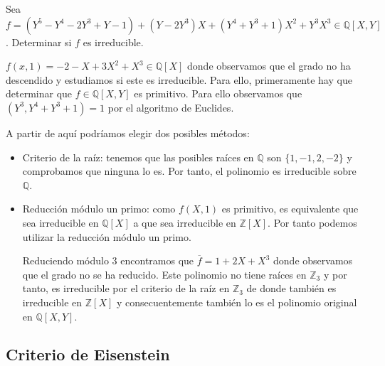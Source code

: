\begin{example}
Sea $f = (Y^5 - Y^4 - 2Y^3 + Y - 1) + (Y - 2Y^3)X + (Y^4 + Y^3 + 1)X^2 + Y^3X^3 \in \mathbb{Q}[X,Y]$. Determinar si $f$ es irreducible. 

$f(x,1) = -2-X+3X^2+X^3 \in \mathbb{Q}[X]$ donde observamos que el grado no ha descendido y estudiamos si este es irreducible. Para ello, primeramente hay que determinar que $f \in \mathbb{Q}[X,Y]$ es primitivo. Para ello observamos que $(Y^3,Y^4+Y^3+1) = 1$ por el algoritmo de Euclides. 

A partir de aquí podríamos elegir dos posibles métodos:

\begin{itemize}
\item Criterio de la raíz: tenemos que las posibles raíces en $\mathbb{Q}$ son $\{1,-1,2,-2\}$ y comprobamos que ninguna lo es. Por tanto, el polinomio es irreducible sobre $\mathbb{Q}$. 

\item Reducción módulo un primo: como $f(X,1)$ es primitivo, es equivalente que sea irreducible en $\mathbb{Q}[X]$ a que sea irreducible en $\mathbb{Z}[X]$. Por tanto podemos utilizar la reducción módulo un primo.

Reduciendo módulo 3 encontramos que $\overline{f} = 1 + 2X + X^3$ donde observamos que el grado no se ha reducido. Este polinomio no tiene raíces en $\mathbb{Z}_3$ y por tanto, es irreducible por el criterio de la raíz en $\mathbb{Z}_3$ de donde también es irreducible en $\mathbb{Z}[X]$ y consecuentemente también lo es el polinomio original en $\mathbb{Q}[X,Y]$.
\end{itemize}
\end{example}

\subsection{Criterio de Eisenstein}

